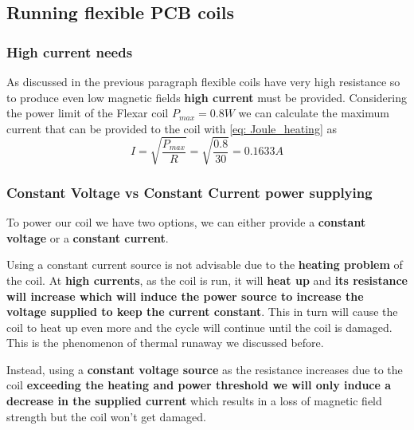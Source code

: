 \subsection{Running flexible PCB coils}

\subsubsection{High current needs}
As discussed in the previous paragraph flexible coils have very high resistance so to produce even low magnetic fields \textbf{high current} must be provided.
Considering the power limit of the Flexar coil $P_{max} = 0.8W$ we can calculate the maximum current that can be provided to the coil with \ref{eq: Joule_heating} as
\begin{equation*}
    I = \sqrt{\frac{P_{max}}{R}} = \sqrt{\frac{0.8}{30}} = 0.1633A
\end{equation*}

\subsubsection{Constant Voltage vs Constant Current power supplying}
To power our coil we have two options, we can either provide a \textbf{constant voltage} or a \textbf{constant current}.

Using a constant current source is not advisable due to the \textbf{heating problem} of the coil.
At \textbf{high currents}, as the coil is run, it will \textbf{heat up} and \textbf{its resistance will increase which will induce the power source to increase the voltage supplied to keep the current constant}.
This in turn will cause the coil to heat up even more and the cycle will continue until the coil is damaged.
This is the phenomenon of thermal runaway we discussed before.

Instead, using a \textbf{constant voltage source} as the resistance increases due to the coil \textbf{exceeding the heating and power threshold we will only induce a decrease in the supplied current} which results in a loss of magnetic field strength but the coil won't get damaged.

